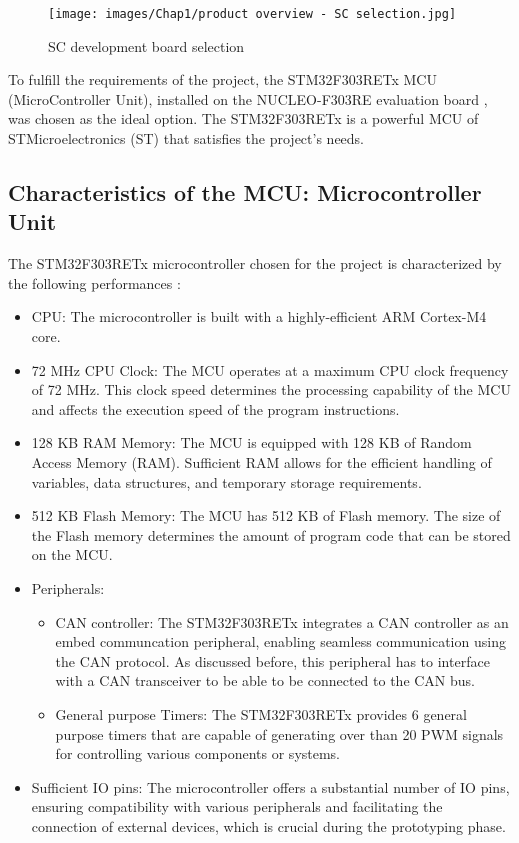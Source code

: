 \begin{figure}[H]
\begin{center}
\texttt{[image: images/Chap1/product overview - SC selection.jpg]}\\
\caption{SC development board selection}
\label{SC selection}
\end{center}
\end{figure} 

To fulfill the requirements of the project, the STM32F303RETx MCU (MicroController Unit), installed on the NUCLEO-F303RE evaluation board \cite{R14}, was chosen as the ideal option. The STM32F303RETx is a powerful MCU of STMicroelectronics (ST) that satisfies the project's needs.

\subsection{Characteristics of the MCU: Microcontroller Unit}

The STM32F303RETx microcontroller chosen for the project is characterized by the following performances \cite{R4}:
\begin{itemize}
    \item CPU: The microcontroller is built with a highly-efficient ARM Cortex-M4 core.
    \item 72 MHz CPU Clock: The MCU operates at a maximum CPU clock frequency of 72 MHz. This clock speed determines the processing capability of the MCU and affects the execution speed of the program instructions.
    \item 128 KB RAM Memory: The MCU is equipped with 128 KB of Random Access Memory (RAM). Sufficient RAM allows for the efficient handling of variables, data structures, and temporary storage requirements.
    \item 512 KB Flash Memory: The MCU has 512 KB of Flash memory. The size of the Flash memory determines the amount of program code that can be stored on the MCU.
    \item Peripherals:
    \begin{itemize}
        \item CAN controller: The STM32F303RETx integrates a CAN controller as an embed communcation peripheral, enabling seamless communication using the CAN protocol. As discussed before, this peripheral has to interface with a CAN transceiver to be able to be connected to the CAN bus.
        \item General purpose Timers: The STM32F303RETx provides 6 general purpose timers that are capable of generating over than 20 PWM signals for controlling various components or systems. 
    \end{itemize}
    \item Sufficient IO pins: The microcontroller offers a substantial number of IO pins, ensuring compatibility with various peripherals and facilitating the connection of external devices, which is crucial during the prototyping phase.
\end{itemize}


